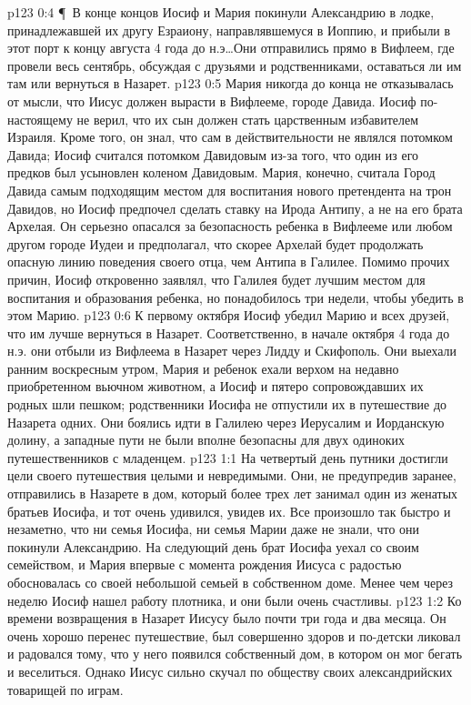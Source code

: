 \vs p123 0:4 \P\ В конце концов Иосиф и Мария покинули Александрию в лодке, принадлежавшей их другу Езраиону, направлявшемуся в Иоппию, и прибыли в этот порт к концу августа 4 года до н.э\ldots  Они отправились прямо в Вифлеем, где провели весь сентябрь, обсуждая с друзьями и родственниками, оставаться ли им там или вернуться в Назарет.
\vs p123 0:5 Мария никогда до конца не отказывалась от мысли, что Иисус должен вырасти в Вифлееме, городе Давида. Иосиф по\hyp{}настоящему не верил, что их сын должен стать царственным избавителем Израиля. Кроме того, он знал, что сам в действительности не являлся потомком Давида; Иосиф считался потомком Давидовым из\hyp{}за того, что один из его предков был усыновлен коленом Давидовым. Мария, конечно, считала Город Давида самым подходящим местом для воспитания нового претендента на трон Давидов, но Иосиф предпочел сделать ставку на Ирода Антипу, а не на его брата Архелая. Он серьезно опасался за безопасность ребенка в Вифлееме или любом другом городе Иудеи и предполагал, что скорее Архелай будет продолжать опасную линию поведения своего отца, чем Антипа в Галилее. Помимо прочих причин, Иосиф откровенно заявлял, что Галилея будет лучшим местом для воспитания и образования ребенка, но понадобилось три недели, чтобы убедить в этом Марию.
\vs p123 0:6 К первому октября Иосиф убедил Марию и всех друзей, что им лучше вернуться в Назарет. Соответственно, в начале октября 4 года до н.э. они отбыли из Вифлеема в Назарет через Лидду и Скифополь. Они выехали ранним воскресным утром, Мария и ребенок ехали верхом на недавно приобретенном вьючном животном, а Иосиф и пятеро сопровождавших их родных шли пешком; родственники Иосифа не отпустили их в путешествие до Назарета одних. Они боялись идти в Галилею через Иерусалим и Иорданскую долину, а западные пути не были вполне безопасны для двух одиноких путешественников с младенцем.
\vs p123 1:1 На четвертый день путники достигли цели своего путешествия целыми и невредимыми. Они, не предупредив заранее, отправились в Назарете в дом, который более трех лет занимал один из женатых братьев Иосифа, и тот очень удивился, увидев их. Все произошло так быстро и незаметно, что ни семья Иосифа, ни семья Марии даже не знали, что они покинули Александрию. На следующий день брат Иосифа уехал со своим семейством, и Мария впервые с момента рождения Иисуса с радостью обосновалась со своей небольшой семьей в собственном доме. Менее чем через неделю Иосиф нашел работу плотника, и они были очень счастливы.
\vs p123 1:2 Ко времени возвращения в Назарет Иисусу было почти три года и два месяца. Он очень хорошо перенес путешествие, был совершенно здоров и по\hyp{}детски ликовал и радовался тому, что у него появился собственный дом, в котором он мог бегать и веселиться. Однако Иисус сильно скучал по обществу своих александрийских товарищей по играм.
